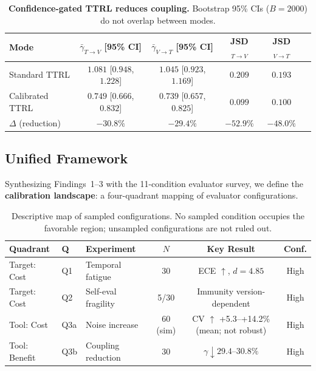 \documentclass[11pt]{article}
\begin{document}
\begin{table}[H]
\centering
\caption{\textbf{Confidence-gated TTRL reduces coupling.} Bootstrap 95\% CIs ($B{=}2000$) do not overlap between modes.}
\label{tab:coupling}
\begin{tabular}{@{}lccccc@{}}
\toprule
Mode & $\bar{\gamma}_{T \to V}$ [95\% CI] & $\bar{\gamma}_{V \to T}$ [95\% CI] & JSD$_{T \to V}$ & JSD$_{V \to T}$ \\
\midrule
Standard TTRL & $1.081$ [$0.948$, $1.228$] & $1.045$ [$0.923$, $1.169$] & $0.209$ & $0.193$ \\
Calibrated TTRL & $0.749$ [$0.666$, $0.832$] & $0.739$ [$0.657$, $0.825$] & $0.099$ & $0.100$ \\
\midrule
$\Delta$ (reduction) & $-30.8\%$ & $-29.4\%$ & $-52.9\%$ & $-48.0\%$ \\
\bottomrule
\end{tabular}
\end{table}


\subsection{Unified Framework}

Synthesizing Findings~1--3 with the 11-condition evaluator survey, we define the \textbf{calibration landscape}: a four-quadrant mapping of evaluator configurations.

\begin{table}[H]
\centering
\caption{Descriptive map of sampled configurations. No sampled condition occupies the favorable region; unsampled configurations are not ruled out.}
\begin{tabular}{@{}lllccc@{}}
\toprule
Quadrant & Q & Experiment & $N$ & Key Result & Conf. \\
\midrule
Target: Cost & Q1 & Temporal fatigue & 30 & ECE $\uparrow$, $d{=}4.85$ & High \\
Target: Cost & Q2 & Self-eval fragility & 5/30 & Immunity version-dependent & High \\
Tool: Cost & Q3a & Noise increase & 60 (sim) & CV $\uparrow$ +5.3--+14.2\% (mean; not robust) & High \\
Tool: Benefit & Q3b & Coupling reduction & 30 & $\gamma \downarrow 29.4$--$30.8\%$ & High \\
\bottomrule
\end{tabular}
\end{table}
\end{document}
